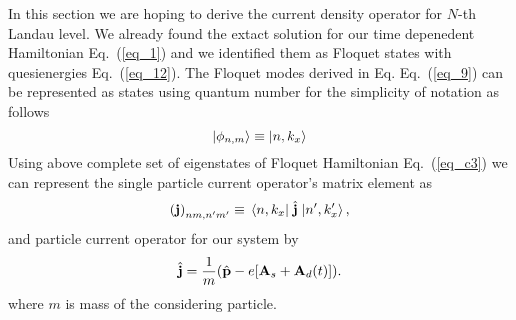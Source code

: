 In this section we are hoping to derive the current density operator for $N$-th Landau level. We already found the extact solution for our time depenedent Hamiltonian Eq.~(\ref{eq_1}) and we identified them as Floquet states with quesienergies Eq.~(\ref{eq_12}). The Floquet modes derived in Eq. Eq.~(\ref{eq_9}) can be represented as states using quantum number for the simplicity of notation as follows
\begin{equation} \label{eq_d1}
  \ket{\phi_{n,m}} \equiv \ket{n,k_x}
\end{equation}
Using above complete set of eigenstates of Floquet Hamiltonian Eq.~(\ref{eq_c3}) \cite{wackerl20,holthaus15,grifoni98} we can represent the single particle current operator's matrix element as
\begin{equation} \label{eq_d2}
  \qty(\vb{j})_{nm,n'm'} \equiv \mel{n,k_x}{\;\hat{\vb{j}}\;}{n',k'_x},
\end{equation}
and particle current operator for our system \cite{mahan00,bruus04} by
\begin{equation} \label{eq_d3}
  \hat{\vb{j}} = \frac{1}{m} \qty(\hat{\vb{p}} - e\qty[\vb{A}_s + \vb{A}_d(t)]).
\end{equation}
where $m$ is mass of the considering particle.

